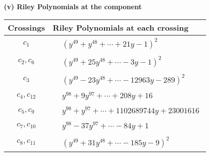 \documentclass[1p]{elsarticle_modified}
\theoremstyle{definition}
\begin{document}
\newpage\renewcommand{\arraystretch}{1}
\flushleft \textbf{(v) Riley Polynomials at the component}\newline \\
\begin{tabular}{m{50pt}|m{274pt}}
Crossings & \hspace{64pt}Riley Polynomials at each crossing \\
\hline $$\begin{aligned}c_{1}\end{aligned}$$&$\begin{aligned}
&(y^{49}+y^{48}+\cdots+21 y-1)^{2}
\end{aligned}$\\
\hline $$\begin{aligned}c_{2},c_{6}\end{aligned}$$&$\begin{aligned}
&(y^{49}+25 y^{48}+\cdots-3 y-1)^{2}
\end{aligned}$\\
\hline $$\begin{aligned}c_{3}\end{aligned}$$&$\begin{aligned}
&(y^{49}-23 y^{48}+\cdots-12963 y-289)^{2}
\end{aligned}$\\
\hline $$\begin{aligned}c_{4},c_{12}\end{aligned}$$&$\begin{aligned}
&y^{98}+9 y^{97}+\cdots+208 y+16
\end{aligned}$\\
\hline $$\begin{aligned}c_{5},c_{9}\end{aligned}$$&$\begin{aligned}
&y^{98}+y^{97}+\cdots+1102689744 y+23001616
\end{aligned}$\\
\hline $$\begin{aligned}c_{7},c_{10}\end{aligned}$$&$\begin{aligned}
&y^{98}-37 y^{97}+\cdots-84 y+1
\end{aligned}$\\
\hline $$\begin{aligned}c_{8},c_{11}\end{aligned}$$&$\begin{aligned}
&(y^{49}+31 y^{48}+\cdots-185 y-9)^{2}
\end{aligned}$\\
\hline
\end{tabular}\\~\\
\end{document}
